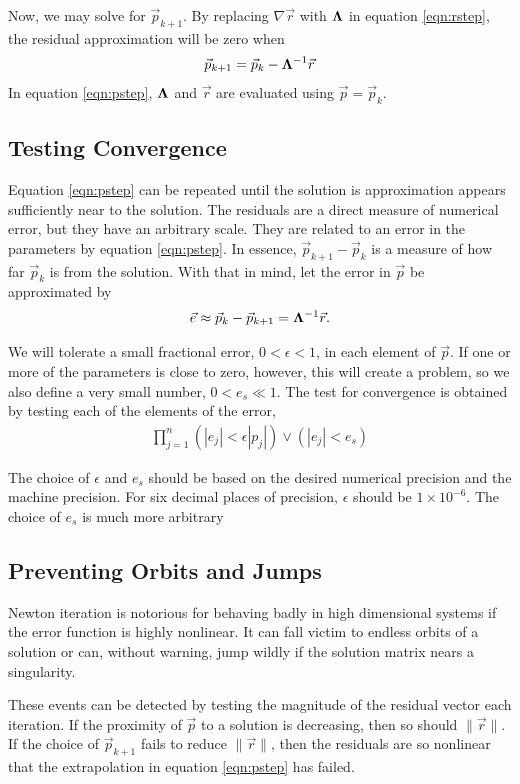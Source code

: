 \documentclass{article}
\def\p{\vec{p}}
\def\r{\vec{r}}
\def\LAM{{\bf \Lambda}}
\begin{document}
Now, we may solve for $\p_{k+1}$.  By replacing $\nabla \r$ with $\LAM$ in equation \ref{eqn:rstep}, the residual approximation will be zero when
\begin{align}
\p_{k+1} = \p_k - \LAM^{-1} \r\label{eqn:pstep}
\end{align}
In equation \ref{eqn:pstep}, $\LAM$ and $\r$ are evaluated using $\p=\p_k$.

\subsection{Testing Convergence}
Equation \ref{eqn:pstep} can be repeated until the solution is approximation appears sufficiently near to the solution.  The residuals are a direct measure of numerical error, but they have an arbitrary scale.  They are related to an error in the parameters by equation \ref{eqn:pstep}.  In essence, $\p_{k+1} - \p_k$ is a measure of how far $\p_{k}$ is from the solution.  With that in mind, let the error in $\p$ be approximated by
\begin{align}
\vec{e} \approx \p_k - \p_{k+1}  = \LAM^{-1} \r.\label{eqn:e}
\end{align}

We will tolerate a small fractional error, $0<\epsilon<1$, in each element of $\p$.  If one or more of the parameters is close to zero, however, this will create a problem, so we also define a very small number, $0<e_s\ll 1$.  The test for convergence is obtained by testing each of the elements of the error,
\begin{align}
\prod_{j=1}^n \left(|e_j| < \epsilon |p_j|\right) \lor \left(|e_j| < e_s\right)
\end{align}

The choice of $\epsilon$ and $e_s$ should be based on the desired numerical precision and the machine precision.  For six decimal places of precision, $\epsilon$ should be $1\times10^{-6}$.  The choice of $e_s$ is much more arbitrary

\subsection{Preventing Orbits and Jumps}
Newton iteration is notorious for behaving badly in high dimensional systems if the error function is highly nonlinear.  It can fall victim to endless orbits of a solution or can, without warning, jump wildly if the solution matrix nears a singularity.  

These events can be detected by testing the magnitude of the residual vector each iteration.  If the proximity of $\p$ to a solution is decreasing, then so should $\|\r\|$.  If the choice of $\p_{k+1}$ fails to reduce $\|\r\|$, then the residuals are so nonlinear that the extrapolation in equation \ref{eqn:pstep} has failed.
\end{document}
